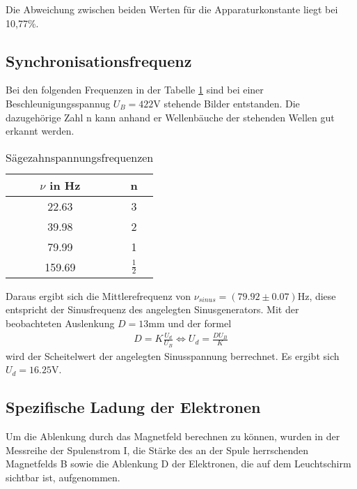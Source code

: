Die Abweichung zwischen beiden Werten für die Apparaturkonstante liegt bei 10,77\%.

\subsection{Synchronisationsfrequenz}
\label{synchro}

Bei den folgenden Frequenzen in der Tabelle \ref{tab:messwerte4} sind bei einer Beschleunigungsspannug $U_B = 422$V stehende Bilder entstanden.
Die dazugehörige Zahl n kann anhand er Wellenbäuche der stehenden Wellen gut erkannt werden.

\FloatBarrier
\begin{table}
  \centering
  \caption{Sägezahnspannungsfrequenzen}
  \label{tab:messwerte4}
  \begin{tabular}{c c}
  \toprule
   $\nu$ in Hz & n \\
  \midrule
  22.63 & 3 \\
  39.98 & 2 \\
  79.99  & 1 \\
  159.69 & $\frac{1}{2}$ \\
  \bottomrule
  \bottomrule
\end{tabular}
\end{table}

Daraus ergibt sich die Mittlerefrequenz von $\nu_{sinus} = (79.92 \pm 0.07) \text{Hz}$, diese entspricht der Sinusfrequenz des angelegten Sinusgenerators.
Mit der beobachteten Auslenkung $D = 13$mm und der formel
\begin{align*}
  D = K \frac{U_d}{U_B} \Leftrightarrow U_d = \frac{D U_B}{K}
\end{align*}
wird der Scheitelwert der angelegten Sinusspannung berrechnet.
Es ergibt sich $U_d = 16.25$V.


\subsection{Spezifische Ladung der Elektronen}
\label{spezLadung}

Um die Ablenkung durch das Magnetfeld berechnen zu können, wurden in der Messreihe
der Spulenstrom I, die Stärke des an der Spule herrschenden Magnetfelds B sowie die Ablenkung D der Elektronen, die auf dem Leuchtschirm sichtbar ist, aufgenommen.

